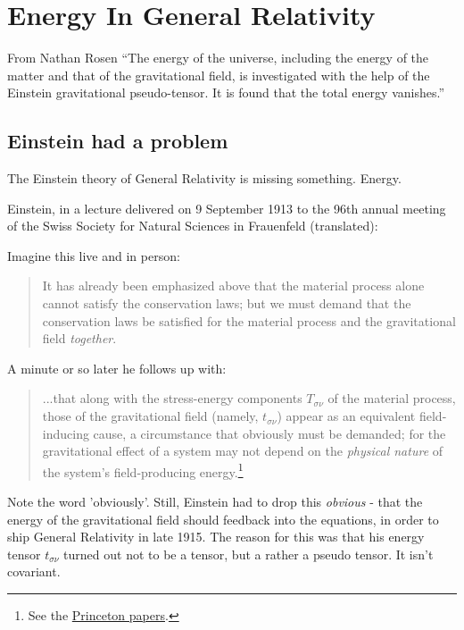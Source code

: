 \documentclass[../rzero]{subfiles}
\begin{document}
\chapter{Energy In General Relativity}\label{energyGeneralRelativityChapter}

\begin{chapquote}{From Nathan Rosen\cite{rosenEnergyUniverse1994}}
``The energy of the universe, including the energy of the matter and that of the gravitational field, is investigated with the help of the Einstein gravitational pseudo-tensor. It is found that the total energy vanishes.''
\end{chapquote}


\section{Einstein had a problem}
The Einstein theory of General Relativity is missing something. Energy.

Einstein, in a lecture delivered on 9 September 1913 to the 96th annual meeting of the Swiss Society for Natural Sciences in Frauenfeld (translated)\cite{naturforschende1914vierteljahrsschrift}: 

Imagine this live and in person: 
\begin{quotation}
	It has already been emphasized above that the material process alone cannot satisfy the conservation laws; but we must demand that the conservation laws be satisfied for the material process and the gravitational field \textit{together}. 
\end{quotation}

A minute or so later he follows up with: 

\begin{quotation} 
...that along with the stress-energy components $T_{\sigma \nu}$ of the material process, those of the gravitational field (namely, $t_{\sigma \nu}$) appear as an equivalent field-inducing cause, a circumstance that obviously must be demanded; for the gravitational effect of a system may not depend on the \textit{physical nature} of the system's field-producing energy.\footnote{See the  \href{https://einsteinpapers.press.princeton.edu/vol4-trans/208}{Princeton papers}.}
\end{quotation}

Note the word 'obviously'. Still, Einstein had to drop this \textit{obvious} - that the energy of the gravitational field should feedback into the equations, in order to ship General Relativity in late 1915. The reason for this was that his energy tensor $t_{\sigma \nu}$ turned out not to be a tensor, but a rather a pseudo tensor. It isn't covariant.  
\end{document}
